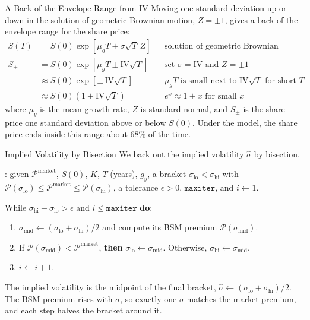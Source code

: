 \documentclass[aspectratio=169,11pt]{beamer}
\begin{document}
\begin{frame}{A Back-of-the-Envelope Range from IV}
  Moving one standard deviation up or down in the solution of geometric
  Brownian motion, $Z=\pm1$, gives a back-of-the-envelope range for the share
  price:
  {\small
  \begin{equation*}
    \begin{aligned}
      S(T) & = S(0)\exp\left[\mu_{g}T + \sigma\sqrt{T}\,Z\right] && \text{solution of geometric Brownian motion}\\
      S_{\pm} & = S(0)\exp\left[\mu_{g}T \pm \text{IV}\sqrt{T}\right] && \text{set } \sigma=\text{IV} \text{ and } Z=\pm 1\\
      & \approx S(0)\exp\left[\pm\,\text{IV}\sqrt{T}\right] && \mu_{g}T \text{ is small next to } \text{IV}\sqrt{T} \text{ for short } T\\
      & \approx S(0)\left(1 \pm \text{IV}\sqrt{T}\right) && e^{x}\approx 1+x \text{ for small } x
    \end{aligned}
  \end{equation*}}%
  where $\mu_{g}$ is the mean growth rate, $Z$ is standard normal, and $S_{\pm}$
  is the share price one standard deviation above or below $S(0)$. Under the
  model, the share price ends inside this range about 68\% of the time.
\end{frame}

\begin{frame}{Implied Volatility by Bisection}
  We back out the implied volatility $\hat{\sigma}$ by bisection.

  \vspace{0.3em}
  : given $\mathcal{P}^{\text{market}}$, $S(0)$, $K$, $T$
  (years), $g_{y}$, a bracket $\sigma_{\text{lo}}<\sigma_{\text{hi}}$ with
  $\mathcal{P}(\sigma_{\text{lo}})\leq\mathcal{P}^{\text{market}}\leq\mathcal{P}(\sigma_{\text{hi}})$,
  a tolerance $\epsilon>0$, $\texttt{maxiter}$, and $i\gets 1$.

  \vspace{0.3em}
  While $\sigma_{\text{hi}}-\sigma_{\text{lo}}>\epsilon$ and $i\leq\texttt{maxiter}$ \textbf{do}:
  \begin{enumerate}\setlength{\itemsep}{0.2em}
    \item $\sigma_{\text{mid}}\gets(\sigma_{\text{lo}}+\sigma_{\text{hi}})/2$
      and compute its BSM premium $\mathcal{P}(\sigma_{\text{mid}})$.
    \item If $\mathcal{P}(\sigma_{\text{mid}})<\mathcal{P}^{\text{market}}$,
      \textbf{then} $\sigma_{\text{lo}}\gets\sigma_{\text{mid}}$. Otherwise,
      $\sigma_{\text{hi}}\gets\sigma_{\text{mid}}$.
    \item $i\gets i+1$.
  \end{enumerate}
  The implied volatility is the midpoint of the final bracket,
  $\hat{\sigma}\gets(\sigma_{\text{lo}}+\sigma_{\text{hi}})/2$. The BSM premium
  rises with $\sigma$, so exactly one $\sigma$ matches the market premium, and
  each step halves the bracket around it.
\end{frame}
\end{document}
